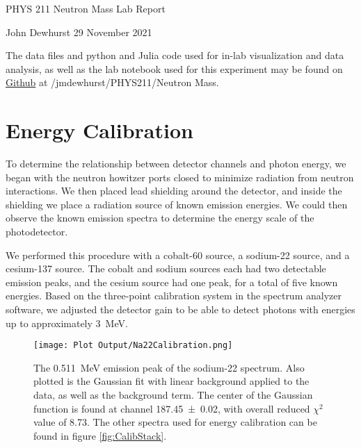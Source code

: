 \documentclass[letter]{article}
\begin{document}

\begin{center}
	{\large PHYS 211 Neutron Mass Lab Report}
	
	John Dewhurst \hspace{1cm}
	29 November 2021
	
	\vspace{1em}
	
	The data files and python and Julia code used for in-lab visualization and data analysis, as well as the lab notebook used for this experiment may be found on \href{https://github.com/jmdewhurst/PHYS211.git}{Github} at /jmdewhurst/PHYS211/Neutron Mass.
	
	\vspace{1em}
\end{center}
	

\section{Energy Calibration}

To determine the relationship between detector channels and photon energy, we began with the neutron howitzer ports closed to minimize radiation from neutron interactions. We then placed lead shielding around the detector, and inside the shielding we place a radiation source of known emission energies. We could then observe the known emission spectra to determine the energy scale of the photodetector.

We performed this procedure with a cobalt-60 source, a sodium-22 source, and a cesium-137 source. The cobalt and sodium sources each had two detectable emission peaks, and the cesium source had one peak, for a total of five known energies. Based on the three-point calibration system in the spectrum analyzer software, we adjusted the detector gain to be able to detect photons with energies up to approximately \qty{3}{\mega\electronvolt}.


\begin{figure}[h] \centering
    \texttt{[image: Plot Output/Na22Calibration.png]}
    \caption{The \qty{.511}{\mega\electronvolt} emission peak of the sodium-22 spectrum. Also plotted is the Gaussian fit with linear background applied to the data, as well as the background term. The center of the Gaussian function is found at channel \num{187.45 \pm 0.02}, with overall reduced $\chi^2$ value of \num{8.73}. The other spectra used for energy calibration can be found in figure \ref{fig:CalibStack}.}
    \label{fig:Na22Calib}
\end{figure}
\end{document}
